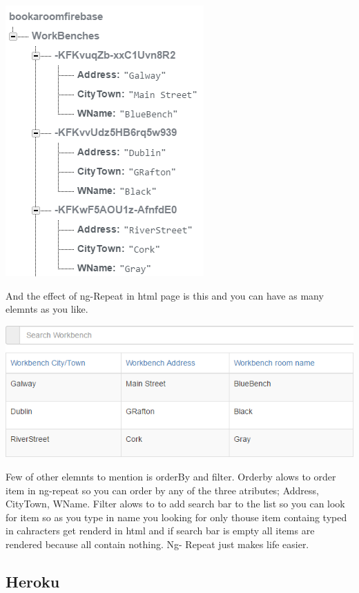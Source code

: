 \begin{center}    
	\includegraphics{img/FirebaseLayout.png}
\end{center}
\bigbreak

And the effect of ng-Repeat in html page is this and you can have as many elemnts as you like.

\begin{center}    
\includegraphics{img/PrintOutHtml.png}
\end{center}
\bigbreak

Few of other elemnts to mention is orderBy and filter. Orderby alows to order item in ng-repeat so you can order by any of the three atributes; Address, CityTown, WName. Filter alows to to add search bar to the list so you can look for item so as you type in name you looking for only thouse item containg typed in cahracters get renderd in html and if search bar is empty all items are rendered because all contain nothing. Ng- Repeat just makes life easier.




\subsection{Heroku}
\bigbreak

